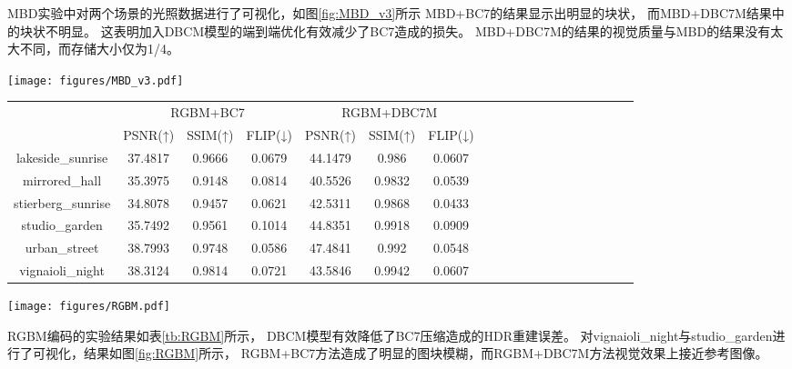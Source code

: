 MBD实验中对两个场景的光照数据进行了可视化，如图\ref{fig:MBD_v3}所示
MBD+BC7的结果显示出明显的块状，
而MBD+DBC7M结果中的块状不明显。
这表明加入DBCM模型的端到端优化有效减少了BC7造成的损失。
MBD+DBC7M的结果的视觉质量与MBD的结果没有太大不同，而存储大小仅为1/4。

\begin{figure*}[htbp]
    \centering
    \texttt{[image: figures/MBD\_v3.pdf]}
    \caption{两个场景光照数据的可视化实验}
    \label{fig:MBD_v3} 
\end{figure*}

\begin{table*}[htbp]
    \caption{6个HDR图像上进行的对比实验}
    \label{tb:RGBM}
    \begin{center}
    \begin{tabular}{ccccccccccccccccccc}
    \toprule
                    & \multicolumn{3}{c}{RGBM+BC7}  & \multicolumn{3}{c}{RGBM+DBC7M}  \\ 
                    & PSNR(↑)   & SSIM(↑) & FLIP(↓)&PSNR(↑)& SSIM(↑) & FLIP(↓) \\
    \midrule
lakeside\_sunrise    & 37.4817   & 0.9666 & 0.0679 &44.1479&0.986&0.0607 \\
mirrored\_hall       & 35.3975   & 0.9148 & 0.0814 &40.5526&0.9832&0.0539 \\
stierberg\_sunrise   & 34.8078   & 0.9457 & 0.0621 &42.5311&0.9868&0.0433 \\
studio\_garden       & 35.7492   & 0.9561 & 0.1014 &44.8351&0.9918&0.0909 \\
urban\_street        & 38.7993   & 0.9748 & 0.0586 &47.4841&0.992&0.0548 \\
vignaioli\_night     & 38.3124   & 0.9814 & 0.0721 &43.5846&0.9942&0.0607 \\
    \bottomrule
    \end{tabular}
    \end{center}
\end{table*}

\begin{figure*}[htbp]
    \centering
    \texttt{[image: figures/RGBM.pdf]}
    \caption{两个HDR纹理的可视化实验}
    \label{fig:RGBM} 
\end{figure*}

RGBM编码的实验结果如表\ref{tb:RGBM}所示，
DBCM模型有效降低了BC7压缩造成的HDR重建误差。
对vignaioli\_night与studio\_garden进行了可视化，结果如图\ref{fig:RGBM}所示，
RGBM+BC7方法造成了明显的图块模糊，而RGBM+DBC7M方法视觉效果上接近参考图像。

